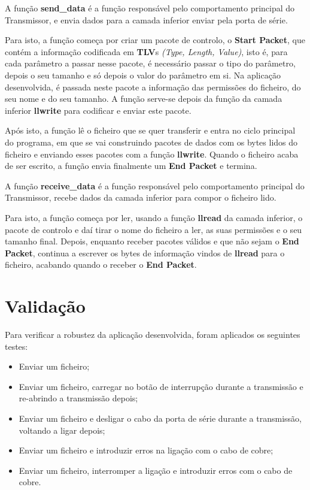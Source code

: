 \documentclass[11pt]{article}
\begin{document}
A função \textbf{send\_data} é a função responsável pelo comportamento principal do Transmissor, e envia dados para a camada inferior enviar pela porta de série. 

Para isto, a função começa por criar um pacote de controlo, o \textbf{Start Packet}, que contém a informação codificada em \textbf{TLV}s \textit{(Type, Length, Value)}, isto é, para cada parâmetro a passar nesse pacote, é necessário passar o tipo do parâmetro, depois o seu tamanho e só depois o valor do parâmetro em si. Na aplicação desenvolvida, é passada neste pacote a informação das permissões do ficheiro, do seu nome e do seu tamanho. A função serve-se depois da função da camada inferior \textbf{llwrite} para codificar e enviar este pacote.

Após isto, a função lê o ficheiro que se quer transferir e entra no ciclo principal do programa, em que se vai construindo pacotes de dados com os bytes lidos do ficheiro e enviando esses pacotes com a função \textbf{llwrite}. Quando o ficheiro acaba de ser escrito, a função envia finalmente um \textbf{End Packet} e termina.


A função \textbf{receive\_data} é a função responsável pelo comportamento principal do Transmissor, recebe dados da camada inferior para compor o ficheiro lido.

Para isto, a função começa por ler, usando a função \textbf{llread} da camada inferior, o pacote de controlo e daí tirar o nome do ficheiro a ler, as suas permissões e o seu tamanho final.
Depois, enquanto receber pacotes válidos e que não sejam o \textbf{End Packet}, continua a escrever os bytes de informação vindos de \textbf{llread} para o ficheiro, acabando quando o receber o \textbf{End Packet}.

\newpage
\section{Validação}

Para verificar a robustez da aplicação desenvolvida, foram aplicados os seguintes testes:
\begin{itemize}
\item Enviar um ficheiro;
\item Enviar um ficheiro, carregar no botão de interrupção durante a transmissão e re-abrindo a transmissão depois;
\item Enviar um ficheiro e desligar o cabo da porta de série durante a transmissão, voltando a ligar depois;
\item Enviar um ficheiro e introduzir erros na ligação com o cabo de cobre;
\item Enviar um ficheiro, interromper a ligação e introduzir erros com o cabo de cobre.
\end{itemize}
\end{document}
